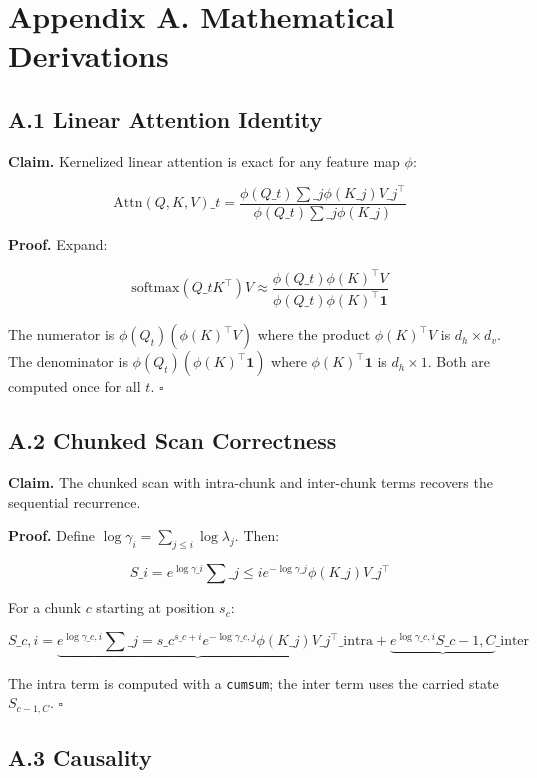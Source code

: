 
\section{Appendix A. Mathematical Derivations}

\subsection{A.1 Linear Attention Identity}

\textbf{Claim.} Kernelized linear attention is exact for any feature map $\phi$:

\[
\text{Attn}(Q, K, V)\_t = \frac{\phi(Q\_t) \sum\_j \phi(K\_j) V\_j^\top}{\phi(Q\_t) \sum\_j \phi(K\_j)}
\tag{A.1}
\]

\textbf{Proof.} Expand:

\[
\text{softmax}(Q\_t K^\top) V \approx \frac{\phi(Q\_t) \phi(K)^\top V}{\phi(Q\_t) \phi(K)^\top \mathbf{1}}
\]

The numerator is $\phi(Q_t) (\phi(K)^\top V)$ where the product 
$\phi(K)^\top V$ is $d_h \times d_v$. The denominator is 
$\phi(Q_t) (\phi(K)^\top \mathbf{1})$ where $\phi(K)^\top \mathbf{1}$ is 
$d_h \times 1$. Both are computed once for all $t$. $\square$

\subsection{A.2 Chunked Scan Correctness}

\textbf{Claim.} The chunked scan with intra-chunk and inter-chunk terms 
recovers the sequential recurrence.

\textbf{Proof.} Define $\log \gamma_i = \sum_{j \leq i} \log \lambda_j$. Then:

\[
S\_i = e^{\log \gamma\_i} \sum\_{j \leq i} e^{-\log \gamma\_j} \phi(K\_j) V\_j^\top
\tag{A.2}
\]

For a chunk $c$ starting at position $s_c$:

\[
S\_{c, i} = \underbrace{e^{\log \gamma\_{c, i}} \sum\_{j=s\_c}^{s\_c+i} e^{-\log \gamma\_{c, j}} \phi(K\_j) V\_j^\top}\_{\text{intra}} + \underbrace{e^{\log \gamma\_{c, i}} S\_{c-1, C}}\_{\text{inter}}
\tag{A.3}
\]

The intra term is computed with a \texttt{cumsum}; the inter term uses the 
carried state $S_{c-1, C}$. $\square$

\subsection{A.3 Causality}

